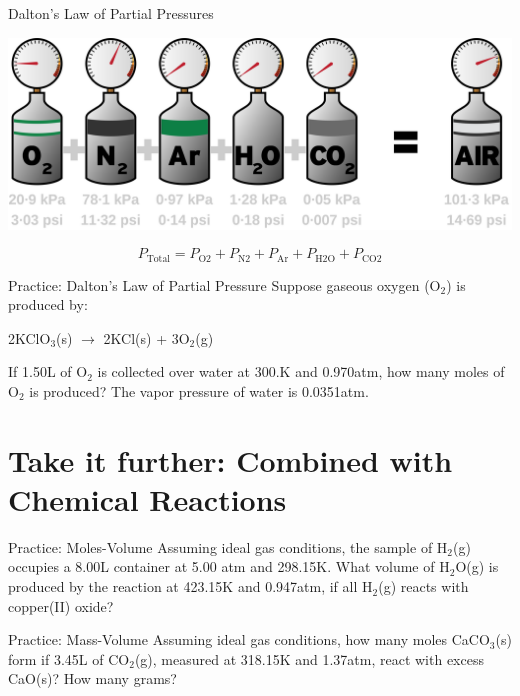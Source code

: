 \documentclass[11pt]{beamer}
\begin{document}
\begin{frame}{Dalton's Law of Partial Pressures}
  \begin{center}
    \includegraphics[width=\linewidth]{dalton_partial}
  \end{center}
  \begin{equation}
    P_\text{Total} = P_\text{O2} + P_\text{N2} + P_\text{Ar}
    + P_\text{H2O} + P_\text{CO2}
    \nonumber
  \end{equation}
\end{frame}

\begin{frame}{Practice: Dalton's Law of Partial Pressure}
  Suppose gaseous oxygen (O$_2$) is produced by:

  2KClO$_3$(s) $\rightarrow$ 2KCl(s) + 3O$_2$(g)

  If 1.50L of O$_2$ is collected over water at 300.K and 0.970atm,
  how many moles of O$_2$ is produced? The vapor pressure of water
  is 0.0351atm.
  \vspace{1.3in}
\end{frame}

\section{Take it further: Combined with Chemical Reactions}

\begin{frame}{Practice: Moles-Volume}
  Assuming ideal gas conditions, the sample of H$_2$(g) occupies a 8.00L
  container at 5.00 atm and 298.15K. What volume of H$_2$O(g) is produced
  by the reaction at 423.15K and 0.947atm, if all H$_2$(g) reacts with
  copper(II) oxide?
  \vspace{1.5in}
\end{frame}

\begin{frame}{Practice: Mass-Volume}
  Assuming ideal gas conditions, how many moles CaCO$_3$(s) form if 3.45L of
  CO$_2$(g), measured at 318.15K and 1.37atm, react with excess CaO(s)? How
  many grams?
  \vspace{1.5in}
\end{frame}
\end{document}
